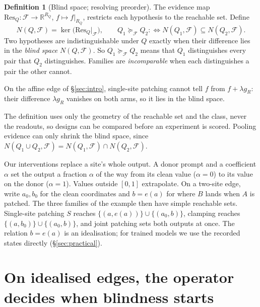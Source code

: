 \documentclass{article}
\theoremstyle{plain}
\theoremstyle{definition}
\newtheorem{definition}[theorem]{Definition}
\begin{document}
\begin{definition}[Blind space; resolving preorder]
\label{def:blind}
The evidence map $\mathrm{Res}_Q:\mathcal F\to\mathbb R^{R_Q}$, $f\mapsto f|_{R_Q}$, restricts each hypothesis to the
reachable set. Define
\[
  N(Q,\mathcal F)=\ker\bigl(\mathrm{Res}_Q|_{\mathcal F}\bigr),\qquad
  Q_1\succeq_{\mathcal F}Q_2 :\iff N(Q_1,\mathcal F)\subseteq N(Q_2,\mathcal F).
\]
Two hypotheses are indistinguishable under $Q$ exactly when their difference lies in the \emph{blind space}
$N(Q,\mathcal F)$. So $Q_1\succeq_{\mathcal F}Q_2$ means that $Q_1$ distinguishes every pair that $Q_2$ distinguishes.
Families are \emph{incomparable} when each distinguishes a pair the other cannot.
\end{definition}

On the affine edge of \S\ref{sec:intro}, single-site patching cannot tell $f$ from $f+\lambda g_R$: their difference
$\lambda g_R$ vanishes on both arms, so it lies in the blind space.

The definition uses only the geometry of the reachable set and the class, never the readouts, so designs can be compared before an
experiment is scored. Pooling evidence can only shrink the blind space, since
$N(Q_1\cup Q_2,\mathcal F)=N(Q_1,\mathcal F)\cap N(Q_2,\mathcal F)$.

Our interventions replace a site's whole output. A donor prompt and a coefficient $\alpha$ set the output a fraction
$\alpha$ of the way from its clean value ($\alpha=0$) to its value on the donor ($\alpha=1$). Values outside $[0,1]$ extrapolate. On a two-site edge, write $a_0,b_0$ for the clean coordinates and $b=e(a)$ for where $B$ lands when $A$
is patched. The three families of the example then have simple reachable sets. Single-site patching $S$ reaches
$\{(a,e(a))\}\cup\{(a_0,b)\}$, clamping reaches $\{(a,b_0)\}\cup\{(a_0,b)\}$, and joint patching sets both outputs at
once. The relation $b=e(a)$ is an idealisation; for trained models we use the recorded states directly
(\S\ref{sec:practical}).

\section{On idealised edges, the operator decides when blindness starts}
\label{sec:theory}
\end{document}
